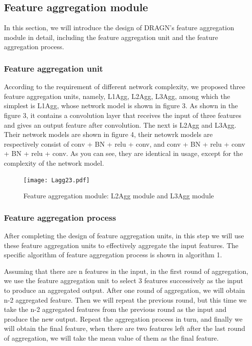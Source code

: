\documentclass[10pt,twocolumn,letterpaper]{article}
\begin{document}
\subsection{Feature aggregation module}
In this section, we will introduce the design of DRAGN's feature aggregation module in detail, including the feature aggregation unit and the feature aggregation process.

\subsubsection{Feature aggregation unit}
According to the requirement of different network complexity, we proposed three feature aggregation units, namely, L1Agg, L2Agg, L3Agg, among which the simplest is L1Agg, whose network model is shown in figure 3. As shown in the figure 3, it contains a convolution layer that receives the input of three features and gives an output feature after convolution. The next is L2Agg and L3Agg. Their network models are shown in figure 4, their netowrk models are respectively consist of conv + BN + relu + conv, and conv + BN + relu + conv + BN + relu + conv. As you can see, they are identical in usage, except for the complexity of the network model.

\begin{figure}[t]
\begin{center}
  \texttt{[image: Lagg23.pdf]}
\end{center}
   \caption{Feature aggregation module: L2Agg module and L3Agg module }
\label{fig:long}
\label{fig:onecol}
\end{figure}


\subsubsection{Feature aggregation process}
After completing the design of feature aggregation units, in this step we will use these feature aggregation units to effectively aggregate the input features. The specific algorithm of feature aggregation process is shown in algorithm 1.

Assuming that there are n features in the input, in the first round of aggregation, we use the feature aggregation unit to select 3 features successively as the input to produce an aggregated output. After one round of aggregation, we will obtain n-2 aggregated feature. Then we will repeat the previous round, but this time we take the n-2 aggregated features from the previous round as the input and produce the new output. Repeat the aggregation process in turn, and finally we will obtain the final feature, when there are two features left after the last round of aggregation, we will take the mean value of them as the final feature.
\end{document}

